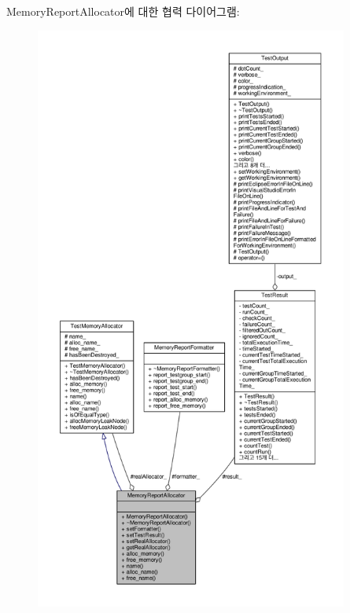 Memory\+Report\+Allocator에 대한 협력 다이어그램\+:
\nopagebreak
\begin{figure}[H]
\begin{center}
\leavevmode
\includegraphics[height=550pt]{class_memory_report_allocator__coll__graph}
\end{center}
\end{figure}
